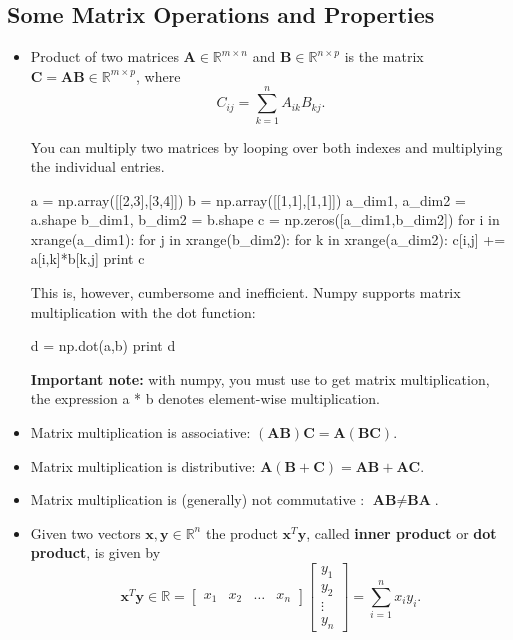 \subsection{Some Matrix Operations and Properties}
\begin{itemize}
\item Product of two matrices $\textbf{A} \in \mathbb{R}^{m\times n}$ and $\textbf{B} \in \mathbb{R}^{n\times p}$
is the matrix $\textbf{C}=\textbf{AB} \in \mathbb{R}^{m\times p}$, where 
\begin{equation*}
C_{ij}=\sum\limits_{k=1}^{n}A_{ik}B_{kj}.
\end{equation*}

\begin{exercise}
You can multiply two matrices by looping over both indexes and multiplying the individual entries.
\begin{python}
a = np.array([[2,3],[3,4]])
b = np.array([[1,1],[1,1]])
a_dim1, a_dim2 = a.shape
b_dim1, b_dim2 = b.shape
c = np.zeros([a_dim1,b_dim2])
for i in xrange(a_dim1):
   for j in xrange(b_dim2):
       for k in xrange(a_dim2):
          c[i,j] += a[i,k]*b[k,j]
print c
\end{python}

This is, however, cumbersome and inefficient. Numpy supports matrix multiplication with the dot function:

\begin{python}
d = np.dot(a,b)
print d
\end{python}

\textbf{Important note:} with numpy, you must use  to get matrix multiplication, the expression {a * b} denotes element-wise multiplication.
\end{exercise}

\item Matrix multiplication is associative: $(\textbf{AB})\textbf{C}= \textbf{A}(\textbf{BC})$.
\item Matrix multiplication is distributive: $\textbf{A}(\textbf{B}+\textbf{C})= \textbf{AB} + \textbf{AC}$.
\item Matrix multiplication is (generally) not commutative : $\textbf{AB} \neq \textbf{BA}$.
\item Given two vectors $\textbf{x},\textbf{y} \in \mathbb{R}^{n}$ the product $\textbf{x}^{T}\textbf{y}$, called {\bf inner product}
or {\bf dot product}, is given by
\begin{equation*}
\textbf{x}^{T}\textbf{y} \in \mathbb{R} = \left[\begin{array}{cccc}
x_{1}&x_{2}&\ldots&x_{n}\end{array}\right] \left[\begin{array}{c}
y_{1} \\
y_{2} \\
\vdots \\
y_{n}
\end{array}\right] = \sum\limits_{i=1}^{n}x_{i}y_{i}.
\end{equation*}


\end{itemize}
